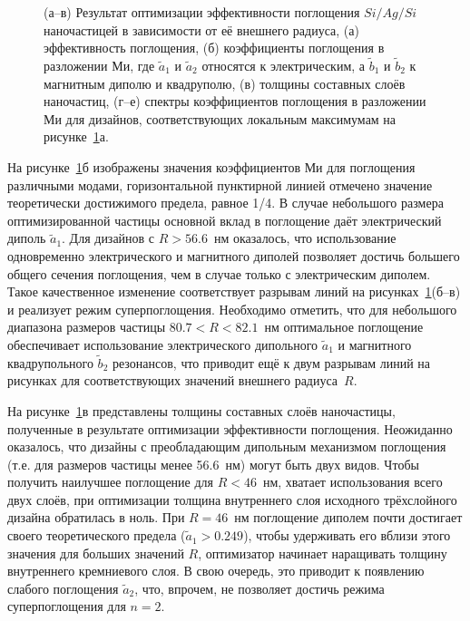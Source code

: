 \begin{figure}[t]
  \begin{minipage}[ht]{0.495\linewidth}
  \end{minipage}
  \hfill
  \begin{minipage}[ht]{0.495\linewidth}
  \end{minipage}
  \caption{ (а--в) Результат оптимизации эффективности поглощения
    $Si/Ag/Si$ наночастицей в зависимости от её внешнего радиуса, (а)
    эффективность поглощения, (б) коэффициенты поглощения в разложении
    Ми, где $\tilde{a}_1$ и $\tilde{a}_2$ относятся к электрическим, а
    $\tilde{b}_1$ и $\tilde{b}_2$ к магнитным диполю и квадруполю, (в)
    толщины составных слоёв наночастиц, (г--е) спектры коэффициентов
    поглощения в разложении Ми для дизайнов, соответствующих локальным
    максимумам на рисунке~\ref{img:q-abs}а.}
  \label{img:q-abs}  
\end{figure}


На рисунке~\ref{img:q-abs}б изображены значения коэффициентов Ми для
поглощения различными модами, горизонтальной пунктирной линией
отмечено значение теоретически достижимого предела, равное 1/4. В
случае небольшого размера оптимизированной частицы основной вклад в
поглощение даёт электрический диполь $\tilde{a}_1$.  Для дизайнов с
$R > 56.6$~нм оказалось, что использование одновременно электрического
и магнитного диполей позволяет достичь большего общего сечения
поглощения, чем в случае только с электрическим
диполем. Такое качественное изменение соответствует разрывам линий на
рисунках~\ref{img:q-abs}(б--в) и реализует режим суперпоглощения.
Необходимо отметить, что для небольшого диапазона размеров частицы
$80.7<R<82.1$~нм оптимальное поглощение обеспечивает использование
электрического дипольного $\tilde{a}_1$ и магнитного квадрупольного
$\tilde{b}_2$ резонансов, что приводит ещё к двум разрывам линий на
рисунках для соответствующих значений внешнего радиуса~$R$.

На рисунке~\ref{img:q-abs}в представлены толщины составных слоёв
наночастицы, полученные в результате оптимизации эффективности
поглощения.  Неожиданно оказалось, что дизайны с преобладающим
дипольным механизмом поглощения (т.е. для размеров частицы менее
56.6~нм) могут быть двух видов.  Чтобы получить наилучшее поглощение
для $R<46$~нм, хватает использования всего двух слоёв, при оптимизации
толщина внутреннего слоя исходного трёхслойного дизайна обратилась в
ноль.  При $R=46$~нм поглощение диполем почти достигает своего
теоретического предела ($\tilde{a}_1>0.249$), чтобы удерживать его
вблизи этого значения для больших значений $R$, оптимизатор начинает
наращивать толщину внутреннего кремниевого слоя.  В свою очередь, это
приводит к появлению слабого поглощения  $\tilde{a}_2$,
что, впрочем, не позволяет достичь режима суперпоглощения для $n=2$.

